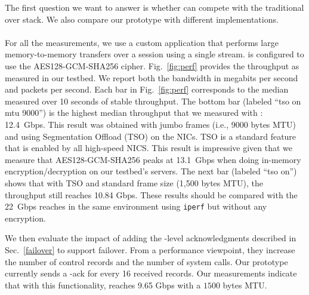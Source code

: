 The first question we want to answer is whether \tcpls can compete with the
traditional \tls over \tcp stack. We also compare our \tcpls prototype with
different \quic implementations.

\paragraph*{\tcpls}
For all the \tcpls measurements, we use a custom application that performs
large memory-to-memory transfers over a \tcpls session using a single stream.
\tcpls is configured to use the AES128-GCM-SHA256 cipher. Fig.~\ref{fig:perf}
provides the throughput as measured in our testbed. We report both the bandwidth in
megabits per second and packets per second. Each bar in Fig.~\ref{fig:perf}
corresponds to the median measured over 10 seconds of stable throughput. The
bottom bar (labeled ``\tcpls tso on mtu 9000'') is the highest median throughput
that we measured with \tcpls: 12.4~Gbps. This result was obtained with jumbo
frames (i.e., 9000 bytes MTU) and using \tcp Segmentation Offload (TSO) on the
NICs. TSO is a standard feature that is enabled by all high-speed NICS. This
result is impressive given that we measure that AES128-GCM-SHA256 peaks at
13.1~Gbps when doing in-memory encryption/decryption on our testbed's servers.
The next bar (labeled ``\tcpls tso on'') shows that with TSO and standard frame
size (1,500 bytes MTU), the throughput still reaches 10.84 Gbps. These
results should be compared with the 22~Gbps \tcp reaches in the same
environment using \texttt{iperf} but without any encryption.



We then evaluate the impact of adding the \tcpls-level acknowledgments
described in Sec.~\ref{failover} to support failover.
From a performance viewpoint, they increase the number of control records and
the number of system calls. Our prototype currently sends a \tcpls-ack for every
16 received records. Our measurements indicate that with this functionality,
\tcpls reaches 9.65 Gbps with a $1500$ bytes MTU.

